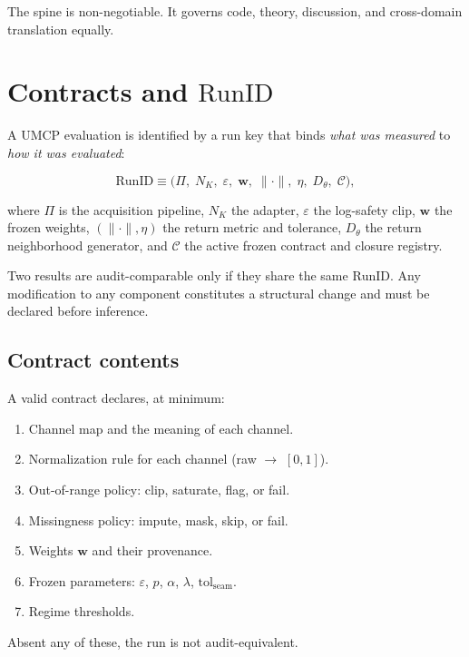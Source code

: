 \documentclass[
  aps,
  prd,
  twocolumn,
  superscriptaddress,
  nofootinbib,
  floatfix
]{revtex4-2}
\newcommand{\eps}{\varepsilon}
\newcommand{\tolseam}{\mathrm{tol}_{\mathrm{seam}}}
\newcommand{\beq}{\begin{equation}}
\newcommand{\eeq}{\end{equation}}
\newcommand{\wvec}{\mathbf{w}}
\newcommand{\RunID}{\mathrm{RunID}}
\begin{document}
The spine is non-negotiable.  It governs code, theory, discussion,
and cross-domain translation equally.


\section{Contracts and \texorpdfstring{$\RunID$}{RunID}}
\label{sec:contracts}

A UMCP evaluation is identified by a run key that binds
\emph{what was measured} to \emph{how it was evaluated}:

\beq
  \RunID \equiv \bigl(\Pi,\; N_K,\; \eps,\; \wvec,\;
  \|\cdot\|,\; \eta,\; D_\theta,\; \mathcal{C}\bigr),
\eeq

where $\Pi$ is the acquisition pipeline, $N_K$ the adapter,
$\eps$ the log-safety clip, $\wvec$ the frozen weights,
$(\|\cdot\|, \eta)$ the return metric and tolerance, $D_\theta$
the return neighborhood generator, and $\mathcal{C}$ the active
frozen contract and closure registry.

Two results are audit-comparable only if they share the same
$\RunID$.  Any modification to any component constitutes a
structural change and must be declared before inference.

\subsection{Contract contents}

A valid contract declares, at minimum:
\begin{enumerate}[leftmargin=*,label=(\arabic*)]
\item Channel map and the meaning of each channel.
\item Normalization rule for each channel (raw $\to$ $[0,1]$).
\item Out-of-range policy: clip, saturate, flag, or fail.
\item Missingness policy: impute, mask, skip, or fail.
\item Weights $\wvec$ and their provenance.
\item Frozen parameters: $\eps$, $p$, $\alpha$, $\lambda$,
  $\tolseam$.
\item Regime thresholds.
\end{enumerate}

Absent any of these, the run is not audit-equivalent.
\end{document}
